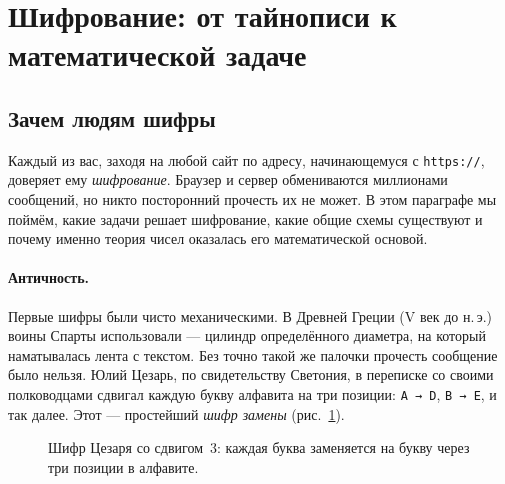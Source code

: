 
\section{Шифрование: от тайнописи к математической задаче}
\label{sec:history}

\subsection{Зачем людям шифры}

Каждый из вас, заходя на любой сайт по адресу, начинающемуся с \texttt{https://}, доверяет ему \emph{шифрование}. Браузер и сервер обмениваются миллионами сообщений, но никто посторонний прочесть их не может. В этом параграфе мы поймём, какие задачи решает шифрование, какие общие схемы существуют и почему именно теория чисел оказалась его математической основой.

\paragraph*{Античность.} Первые шифры были чисто механическими. В Древней Греции (V век до н.\,э.) воины Спарты использовали  --- цилиндр определённого диаметра, на который наматывалась лента с текстом. Без точно такой же палочки прочесть сообщение было нельзя. Юлий Цезарь, по свидетельству Светония, в переписке со своими полководцами сдвигал каждую букву алфавита на три позиции: \texttt{A → D}, \texttt{B → E}, и так далее. Этот  --- простейший \emph{шифр замены} (рис.~\ref{fig:p2-1}).

\begin{figure}[H]
\centering
{}
\caption{Шифр Цезаря со сдвигом~3: каждая буква заменяется на букву через три позиции в алфавите.}
\label{fig:p2-1}
\end{figure}

